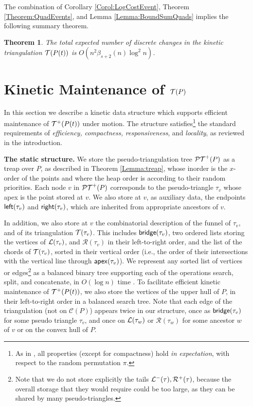 \documentclass[11pt]{article}
\def\bridge{{\sf bridge}}
\def\PT{{\cal PT}}
\def\T{{\cal T}}
\def\C{\mathcal{C}}
\def\L{{\cal L}}
\def\R{\mathcal{R}}
\def\Left{{\sf left}}
\def\Right{{\sf right}}
\def\apex{{\sf apex}}
\newtheorem{theorem}{Theorem}[section]
\begin{document}
The combination of Corollary \ref{Corol:LogCostEvent},
Theorem 
\ref{Theorem:QuadEvents}, and Lemma \ref{Lemma:BoundSumQuads} implies
the following summary theorem.
\begin{theorem}
The total expected number of discrete changes in the kinetic triangulation $\T(P(t))$ is $O(n^2\beta_{s+2}(n)\log^2n)$.
\end{theorem}

\section{Kinetic Maintenance of $\T(P)$}\label{Sec:DataStruct}
In this section we describe a kinetic data structure which
supports efficient maintenance of $\T^+(P(t))$ under motion.
The structure satisfies\footnote{\small As in \cite{AKS}, all properties (except for compactness) hold \textit{in expectation}, with respect to the random permutation $\pi$.} the standard requirements of \textit{efficiency, compactness, responsiveness}, and \textit{locality}, as reviewed in the introduction.

\medskip
\noindent
{\bf The static structure.}
We store the pseudo-triangulation tree $\PT^+(P)$ as a treap over $P$, as
described in Theorem \ref{Lemma:treap}, whose inorder is the $x$-order of the points and where
the heap order is according to their random priorities. Each node $v$ in $\PT^+(P)$
corresponds to the pseudo-triangle $\tau_v$ 
whose apex is the point stored at $v$. We also store at $v$, as auxiliary data,
the endpoints $\Left(\tau_v)$ and $\Right(\tau_v)$, which are inherited from appropriate ancestors of $v$.

In addition, we also store at $v$ the combinatorial description of the
funnel of $\tau_v$, and of its triangulation $\T(\tau_v)$.  This includes
$\bridge(\tau_v)$, two ordered lists storing the vertices of
$\L(\tau_v)$, and $\R(\tau_v)$ in their left-to-right order, and the list of
the chords of $\T(\tau_v)$, sorted in their vertical order (i.e., the order of their intersections
with the vertical line through $\apex(\tau_v)$).  We
represent any sorted list of vertices or edges\footnote{\small Note that we do not store explicitly the tails $\L^-(\tau),\R^+(\tau)$, because the overall storage that they would require could be too large, as they can be shared by many pseudo-triangles.} as a balanced
binary tree supporting each of the operations {\sf search}, {\sf split}, and {\sf concatenate},
 in $O(\log n)$ time \cite{Tarjan}.
To facilitate efficient kinetic maintenance of $\T^+(P(t))$, we also store
the vertices of the upper hull of $P$, in their left-to-right
order in a balanced search tree. Note that each edge of the triangulation (not on $\C(P)$) appears twice in our structure, once as $\bridge(\tau_v)$ for some pseudo triangle $\tau_v$, and once on $\L(\tau_w)$ or $\R(\tau_w)$ for some ancestor $w$ of $v$ or on the convex hull of $P$.
\end{document}
